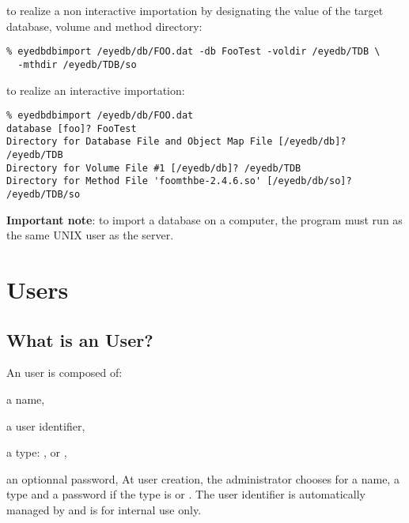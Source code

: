 \normalsize
\item to realize a non interactive importation by designating the value
of the target database, volume and method directory:
\verbsize
\begin{verbatim}
% eyedbdbimport /eyedb/db/FOO.dat -db FooTest -voldir /eyedb/TDB \
  -mthdir /eyedb/TDB/so
\end{verbatim}
\normalsize
\item to realize an interactive importation:
\verbsize
\begin{verbatim}
% eyedbdbimport /eyedb/db/FOO.dat
database [foo]? FooTest
Directory for Database File and Object Map File [/eyedb/db]? /eyedb/TDB
Directory for Volume File #1 [/eyedb/db]? /eyedb/TDB
Directory for Method File 'foomthbe-2.4.6.so' [/eyedb/db/so]? /eyedb/TDB/so
\end{verbatim}
\normalsize
\ei
{\bf Important note}: to import a database on a computer, the program
 must run as the same UNIX user as the \eyedb server.
\section{Users}
\subsection{What is an \eyedb User?}
An \eyedb user is composed of:
\be
\item a name,
\item a user identifier,
\item a type: ,  or ,
\item an optionnal password,
\ee
At user creation, the administrator chooses for a name, a type and
a password if the type is  or . The user identifier
is automatically managed by \eyedb and is for internal use only.

